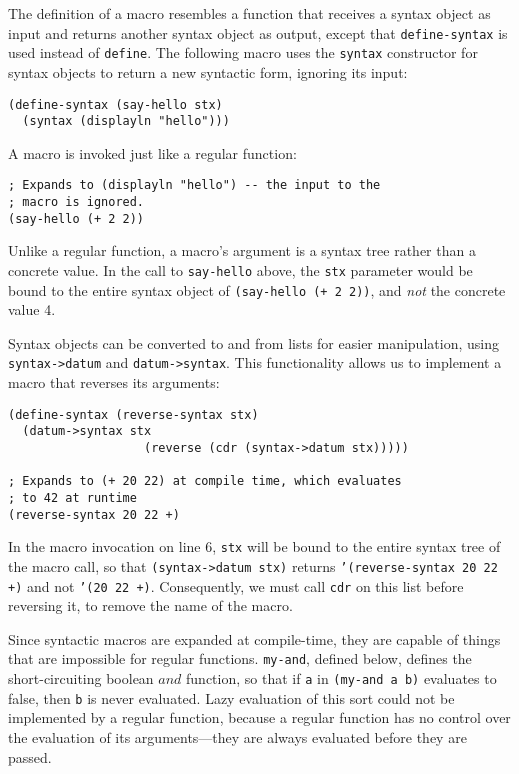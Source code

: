 \documentclass{article}
\begin{document}
The definition of a macro resembles a function that receives a syntax object as input and returns another syntax object as output, except that \texttt{define-syntax} is used instead of \texttt{define}. The following macro uses the \texttt{syntax} constructor for syntax objects to return a new syntactic form, ignoring its input:

\begin{lstlisting}
(define-syntax (say-hello stx)
  (syntax (displayln "hello")))
\end{lstlisting}

A macro is invoked just like a regular function:

\begin{lstlisting}
; Expands to (displayln "hello") -- the input to the
; macro is ignored.
(say-hello (+ 2 2))
\end{lstlisting}

Unlike a regular function, a macro's argument is a syntax tree rather than a concrete value. In the call to \texttt{say-hello} above, the \texttt{stx} parameter would be bound to the entire syntax object of \texttt{(say-hello (+ 2 2))}, and \textit{not} the concrete value 4.

Syntax objects can be converted to and from lists for easier manipulation, using \texttt{syntax->datum} and \texttt{datum->syntax}. This functionality allows us to implement a macro that reverses its arguments:

\begin{lstlisting}
(define-syntax (reverse-syntax stx)
  (datum->syntax stx
                   (reverse (cdr (syntax->datum stx)))))

; Expands to (+ 20 22) at compile time, which evaluates
; to 42 at runtime
(reverse-syntax 20 22 +)
\end{lstlisting}

In the macro invocation on line 6, \texttt{stx} will be bound to the entire syntax tree of the macro call, so that \texttt{(syntax->datum stx)} returns \texttt{'(reverse-syntax 20 22 +)} and not \texttt{'(20 22 +)}. Consequently, we must call \texttt{cdr} on this list before reversing it, to remove the name of the macro.

Since syntactic macros are expanded at compile-time, they are capable of things that are impossible for regular functions. \texttt{my-and}, defined below, defines the short-circuiting boolean $and$ function, so that if \texttt{a} in \texttt{(my-and a b)} evaluates to false, then \texttt{b} is never evaluated. Lazy evaluation of this sort could not be implemented by a regular function, because a regular function has no control over the evaluation of its arguments---they are always evaluated before they are passed.
\end{document}
